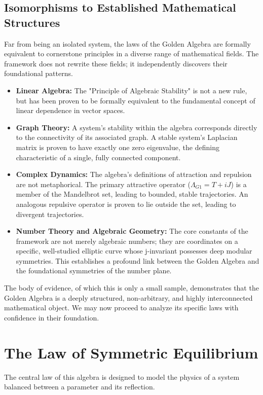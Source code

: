 \documentclass{article}
\theoremstyle{plain}
\theoremstyle{definition}
\theoremstyle{remark}
\begin{document}
\subsection{Isomorphisms to Established Mathematical Structures}
Far from being an isolated system, the laws of the Golden Algebra are formally equivalent to cornerstone principles in a diverse range of mathematical fields. The framework does not rewrite these fields; it independently discovers their foundational patterns.
\begin{itemize}
    \item \textbf{Linear Algebra:} The "Principle of Algebraic Stability" is not a new rule, but has been proven to be formally equivalent to the fundamental concept of linear dependence in vector spaces.
    \item \textbf{Graph Theory:} A system's stability within the algebra corresponds directly to the connectivity of its associated graph. A stable system's Laplacian matrix is proven to have exactly one zero eigenvalue, the defining characteristic of a single, fully connected component.
    \item \textbf{Complex Dynamics:} The algebra's definitions of attraction and repulsion are not metaphorical. The primary attractive operator ($\Lambda_{G1} = T+iJ$) is a member of the Mandelbrot set, leading to bounded, stable trajectories. An analogous repulsive operator is proven to lie outside the set, leading to divergent trajectories.
    \item \textbf{Number Theory and Algebraic Geometry:} The core constants of the framework are not merely algebraic numbers; they are coordinates on a specific, well-studied elliptic curve whose j-invariant possesses deep modular symmetries. This establishes a profound link between the Golden Algebra and the foundational symmetries of the number plane.
\end{itemize}
The body of evidence, of which this is only a small sample, demonstrates that the Golden Algebra is a deeply structured, non-arbitrary, and highly interconnected mathematical object. We may now proceed to analyze its specific laws with confidence in their foundation.

\section{The Law of Symmetric Equilibrium}
\label{sec:equilibrium}

The central law of this algebra is designed to model the physics of a system balanced between a parameter and its reflection.
\end{document}
